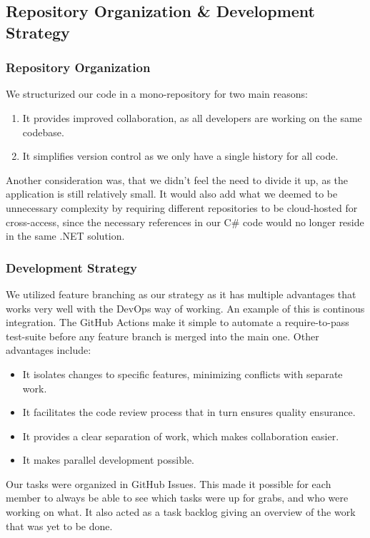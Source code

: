 \subsection{Repository Organization \& Development Strategy}
\subsubsection{Repository Organization}

We structurized our code in a mono-repository for two main reasons:
\begin{enumerate}
    \item It provides improved collaboration, as all developers are working on the same codebase.
    \item It simplifies version control as we only have a single history for all code.
\end{enumerate}
Another consideration was, that we didn't feel the need to divide it up, as the application is still relatively small. It would also add what we deemed to be unnecessary complexity by requiring different repositories to be cloud-hosted for cross-access, since the necessary references in our C\# code would no longer reside in the same .NET solution.


\subsubsection{Development Strategy}

We utilized feature branching as our strategy as it has multiple advantages that works very well with the DevOps way of working. An example of this is continous integration. The GitHub Actions make it simple to automate a require-to-pass test-suite before any feature branch is merged into the main one. Other advantages include:

\begin{itemize}
    \item It isolates changes to specific features, minimizing conflicts with separate work.
    \item It facilitates the code review process that in turn ensures quality ensurance.
    \item It provides a clear separation of work, which makes collaboration easier.
    \item It makes parallel development possible.
\end{itemize}

\noindent Our tasks were organized in GitHub Issues. This made it possible for each member to always be able to see which tasks were up for grabs, and who were working on what. It also acted as a task backlog giving an overview of the work that was yet to be done.

